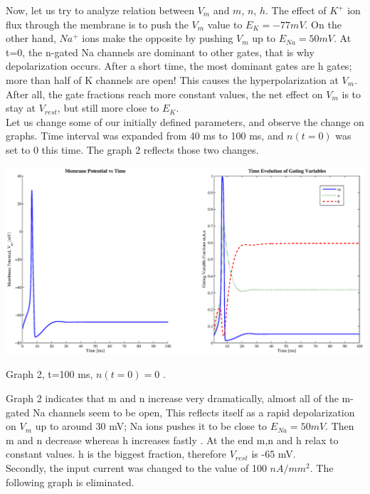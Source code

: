 \documentclass{article}
\begin{document}
Now, let us try to analyze relation between $V_{m}$ and $m$, $n$, $h$. The effect of $K^+$ ion flux through the membrane is to push the $V_{m}$ value to $E_{K}=-77 mV$. On the other hand, $Na^+$ ions make the opposite by pushing $V_{m}$ up to $E_{Na}=50 mV$. At t=0, the n-gated Na channels are dominant to other gates, that is why depolarization occurs. After a short time, the most dominant gates are h gates; more than half of K channels are open! This causes the hyperpolarization at $V_{m}$. After all, the gate fractions reach more constant values, the net effect on $V_{m}$ is to stay at $V_{rest}$, but still more close to $E_{K}$.\\

Let us change some of our initially defined parameters, and observe the change on graphs. Time interval was expanded from 40 ms to 100 ms, and $n(t=0)$ was set to 0 this time. The graph 2 reflects those two changes.
\begin{center}
 \includegraphics[width=\textwidth]{discus1.eps}
\begin{footnotesize}Graph 2, t=100 ms, $n(t=0)=0$ . \end{footnotesize}
\end{center}

Graph 2 indicates that m and n increase very dramatically, almost all of the m-gated Na channels seem to be open, This reflects itself as a rapid depolarization on $V_{m}$ up to around 30 mV; Na ions pushes it to be close to $E_{Na}=50 mV$. Then m and n decrease whereas h increases fastly . At the end m,n and h relax to constant values. h is the biggest fraction, therefore $V_{rest}$ is -65 mV. \\

Secondly, the input current was changed to the value of 100 $nA/mm^2$. The following graph is eliminated.
\end{document}
